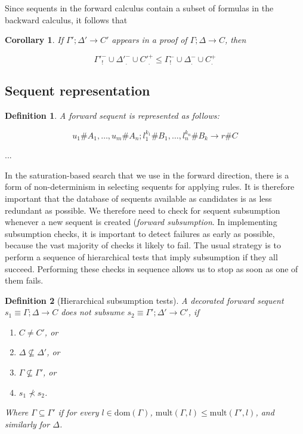 \documentclass{article}
\newtheorem{definition}{Definition}
\newtheorem{corollary}{Corollary}
\begin{document}
Since sequents in the forward calculus contain a subset of formulas in the
backward calculus, it follows that

\begin{corollary}
  If $\Gamma'; \Delta' \longrightarrow C'$ appears in a proof of
  $\Gamma; \Delta \longrightarrow C$, then

  \[
    \Gamma'^-_! \cup \Delta'^-_. \cup C'^+_. \leq \Gamma^-_! \cup
    \Delta^-_. \cup C^+_.
  \]
\end{corollary}

\subsection{Sequent representation}

\begin{definition}
  A forward sequent is represented as follows:

  \[
    u_1 \# A_1, \dots, u_m \# A_n ; l_1^{k_1} \# B_1, \dots, l_n^{k_n} \# B_k
    \longrightarrow r \# C
  \]
\end{definition}

...

In the saturation-based search that we use in the forward direction, there is a
form of non-determinism in selecting sequents for applying rules. It is
therefore important that the database of sequents available as candidates is as
less redundant as possible. We therefore need to check for sequent subsumption
whenever a new sequent is created (\emph{forward subsumption}. In implementing
subsumption checks, it is important to detect failures as early as possible,
because the vast majority of checks it likely to fail. The usual strategy is to
perform a sequence of hierarchical tests that imply subsumption if they all
succeed. Performing these checks in sequence allows us to stop as soon as one of
them fails.

\begin{definition}[Hierarchical subsumption tests]
  A decorated forward sequent $s_1 \equiv \Gamma; \Delta \longrightarrow C$ does
  not subsume $s_2 \equiv \Gamma'; \Delta' \longrightarrow C'$, if

  \begin{enumerate}
  \item $C \neq C'$, or
  \item $\Delta \not \subseteq \Delta'$, or
  \item $\Gamma \not \subseteq \Gamma'$, or
  \item $s_1 \not \prec s_2$.
  \end{enumerate}

  Where $\Gamma \subseteq \Gamma'$ if for every $l \in \mathrm{dom}(\Gamma)$,
  $\mathrm{mult}(\Gamma, l) \leq \mathrm{mult}(\Gamma', l)$, and similarly for
  $\Delta$.
\end{definition}
\end{document}
